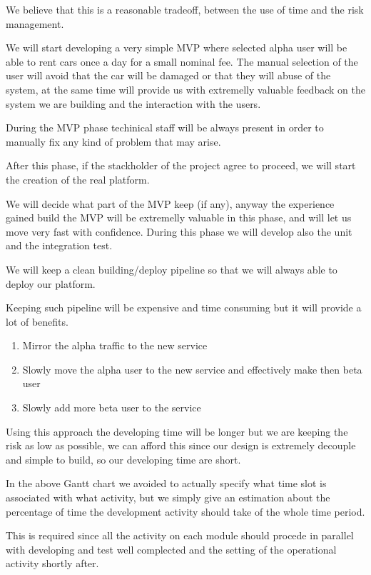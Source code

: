 \documentclass[11pt]{article} %
\begin{document}
We believe that this is a reasonable tradeoff, between the use of time and the risk management.

We will start developing a very simple MVP where selected alpha user will be able to rent cars once a day for a small nominal fee. The manual selection of the user will avoid that the car will be damaged or that they will abuse of the system, at the same time will provide us with extremelly valuable feedback on the system we are building and the interaction with the users.

During the MVP phase techinical staff will be always present in order to manually fix any kind of problem that may arise.

After this phase, if the stackholder of the project agree to proceed, we will start the creation of the real platform.

We will decide what part of the MVP keep (if any), anyway the experience gained build the MVP will be extremelly valuable in this phase, and will let us move very fast with confidence. 
During this phase we will develop also the unit and the integration test.

We will keep a clean building/deploy pipeline so that we will always able to deploy our platform.

Keeping such pipeline will be expensive and time consuming but it will provide a lot of benefits.

\begin{enumerate}
	\item Mirror the alpha traffic to the new service
	\item Slowly move the alpha user to the new service and effectively make then beta user
	\item Slowly add more beta user to the service
\end{enumerate}

Using this approach the developing time will be longer but we are keeping the risk as low as possible, we can afford this since our design is extremely decouple and simple to build, so our developing time are short.



In the above Gantt chart we avoided to actually specify what time slot is associated with what activity, but we simply give an estimation about the percentage of time the development activity should take of the whole time period.

This is required since all the activity on each module should procede in parallel with developing and test well complected and the setting of the operational activity shortly after.
\end{document}
